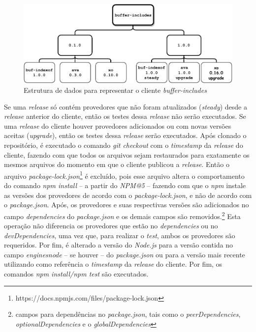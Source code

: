 \begin{figure}
    \centering
    \includegraphics[scale=0.9]{figuras/bcdetect_work.pdf}
    \caption{Estrutura de dados para representar o cliente \textit{buffer-includes}}
    \label{fig:bc_work}
\end{figure}{}

Se uma \textit{release} só contém provedores que não foram atualizados (\textit{steady}) desde a \textit{release} anterior do cliente, então os testes dessa \textit{release} não serão executados. Se uma \textit{release} do cliente houver provedores adicionados ou com novas versões aceitas (\textit{upgrade}), então os testes dessa \textit{release} serão executados. Após clonado o repositório, é executado o comando \textit{git checkout} com o \textit{timestamp} da \textit{release} do cliente, fazendo com que todos os arquivos sejam restaurados para exatamente os mesmos arquivos do momento em que o cliente publicou a \textit{release}. Então o arquivo \textit{package-lock.json}\footnote{https://docs.npmjs.com/files/package-lock.json} é excluído, pois esse arquivo altera o comportamento do comando \textit{npm install} -- a partir do \textit{NPM@5} -- fazendo com que o \textit{npm} instale as versões dos provedores de acordo com o \textit{package-lock.json}, e não de acordo com o \textit{package.json}. Após, os provedores e suas respectivas versões são adicionados no campo \textit{dependencies} do \textit{package.json} e os demais campos são removidos.\footnote{campos para dependências no \textit{package.json}, tais como o \textit{peerDependencies}, \textit{optionalDependencies} e o \textit{globalDependencies}} Esta operação não diferencia os provedores que estão no \textit{dependencies} ou no \textit{devDependencies}, uma vez que, para realizar o \textit{test}, ambos os provedores são requeridos. Por fim, é alterado a versão do \textit{Node.js} para a versão contida no campo \textit{engines\textrightarrow node} -- se houver -- do \textit{package.json} ou para a versão mais recente utilizando como referência o \textit{timestamp} da \textit{release} do cliente. Por fim, os comandos \textit{npm install/npm test} são executados.

